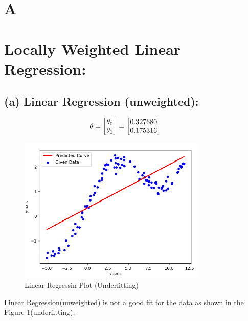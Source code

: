 \documentclass[a4 paper]{article}
\begin{document}

\section{A}

\section{Locally Weighted Linear Regression:}

\subsection*{(a) Linear Regression (unweighted):}

$$ \hspace*{-0.75cm} \theta = 
\begin{bmatrix}
	\theta_0 \\  \theta_1 \\
\end{bmatrix}
= 
\begin{bmatrix}
	0.327680 \\
	0.175316
\end{bmatrix} $$

\vspace*{-0.5cm}
\begin{figure}[!htb]
	\centering
	\includegraphics[width = 90mm]{./Plots/2a.png}
	\caption{Linear Regressin Plot (Underfitting)}
  	\label{fig1}
\end{figure}

Linear Regression(unweighted) is not a good fit for the data as shown in the Figure 1(underfitting).
\end{document}
